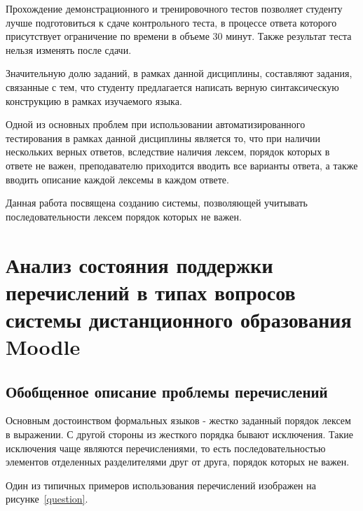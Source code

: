 \documentclass[a4paper,english,russian]{G2-105}
\begin{document}
\par Прохождение демонстрационного и тренировочного тестов  позволяет студенту
лучше подготовиться к сдаче контрольного теста, в процессе ответа которого
присутствует ограничение по времени в объеме 30 минут. Также результат  теста
нельзя изменять после сдачи.
\par Значительную долю заданий, в рамках данной дисциплины, составляют задания,
связанные с тем, что студенту предлагается написать верную синтаксическую
конструкцию в рамках изучаемого языка.
\par Одной из основных проблем при использовании автоматизированного
тестирования в рамках данной дисциплины  является то, что при наличии нескольких
 верных ответов, вследствие наличия лексем, порядок которых в ответе не важен,
преподавателю приходится вводить все варианты ответа, а также вводить описание
каждой лексемы в каждом ответе.
\par Данная работа посвящена созданию системы, позволяющей учитывать
последовательности лексем порядок которых не важен.
\newpage

\chapter{Анализ состояния поддержки перечислений в типах вопросов системы дистанционного образования Moodle}
\ttl
\section{Обобщенное описание проблемы перечислений}

\par Основным достоинством формальных языков - жестко заданный порядок лексем в выражении. С другой стороны из жесткого порядка бывают исключения. Такие исключения чаще являются перечислениями, то есть последовательностью элементов отделенных разделителями друг от друга, порядок которых не важен.
\par Один из типичных примеров использования перечислений изображен на рисунке~\ref{question}.
\end{document}
